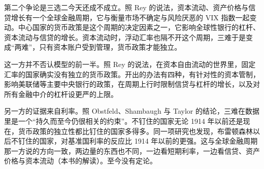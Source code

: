 第二个争论是三选二今天还成不成立。照 Rey 的说法，资本流动、资产价格与信贷增长有一个全球金融周期，它与衡量市场不确定与风险厌恶的 VIX 指数一起变动\cite{rey2015}。中心国家的货币政策是这个周期的决定因素之一，它影响全球性银行的杠杆、资本流动与信贷的增长\cite{rey2015}。资本流动时，浮动汇率也隔不开这个周期，三难于是变成“两难”，只有资本账户受到管理，货币政策才能独立\cite{rey2015}。

这一方并不否认模型的前一半。照 Rey 的说法，在资本自由流动的世界里，固定汇率的国家确实没有独立的货币政策\cite{rey2015}。开出的办法有四种，有针对性的资本管制，影响美联储等主要中央银行的政策，在周期上行时限制信贷与杠杆的增长，以及对所有金融中介的杠杆设更严的上限\cite{rey2015}。

另一方的证据来自利率。照 Obstfeld、Shambaugh 与 Taylor 的结论，三难在数据里是一个“持久而至今仍很相关的约束”\cite{ost2004}。不钉住的国家无论 1914 年以前还是现在，货币政策的独立性都比钉住的国家多得多\cite{ost2004}。同一项研究也发现，布雷顿森林以后不钉住的国家，对基准国利率的反应比 1914 年以前的更强\cite{ost2004}。这与全球金融周期那一方说的方向一致，两边量的东西也不同，一边看短期利率，一边看信贷、资产价格与资本流动（本书的解读）。至今没有定论。

